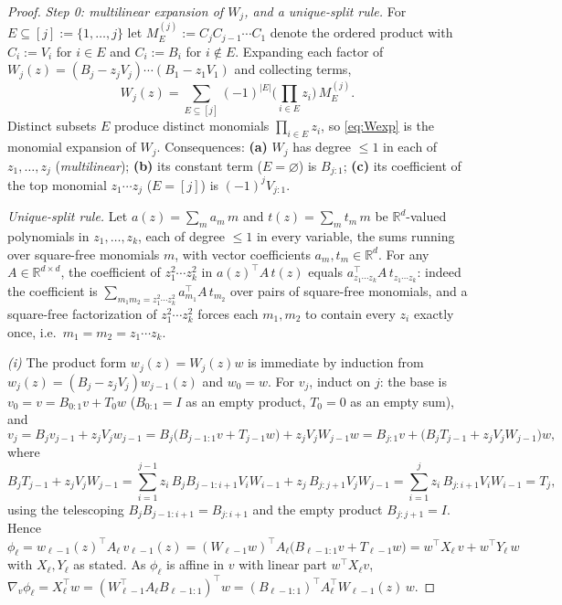 \documentclass[11pt]{article}
\theoremstyle{definition}
\theoremstyle{remark}
\theoremstyle{plain}
\newcommand{\R}{\mathbb{R}}
\begin{document}
\begin{proof}
\emph{Step 0: multilinear expansion of $W_j$, and a unique-split rule.}
For $E\subseteq[j]:=\{1,\dots,j\}$ let $M^{(j)}_E:=C_jC_{j-1}\cdots C_1$ denote the ordered
product with $C_i:=V_i$ for $i\in E$ and $C_i:=B_i$ for $i\notin E$.  Expanding each factor
of $W_j(z)=(B_j-z_jV_j)\cdots(B_1-z_1V_1)$ and collecting terms,
\begin{equation}\label{eq:Wexp}
W_j(z)=\sum_{E\subseteq[j]}(-1)^{|E|}\Big(\prod_{i\in E}z_i\Big)\,M^{(j)}_E .
\end{equation}
Distinct subsets $E$ produce distinct monomials $\prod_{i\in E}z_i$, so \eqref{eq:Wexp} is
the monomial expansion of $W_j$.  Consequences: \textbf{(a)} $W_j$ has degree $\le1$ in
each of $z_1,\dots,z_j$ (\emph{multilinear}); \textbf{(b)} its constant term
($E=\varnothing$) is $B_{j:1}$; \textbf{(c)} its coefficient of the top monomial
$z_1\cdots z_j$ ($E=[j]$) is $(-1)^{j}V_{j:1}$.

\emph{Unique-split rule.}  Let $a(z)=\sum_m a_m\,m$ and $t(z)=\sum_m t_m\,m$ be
$\R^d$-valued polynomials in $z_1,\dots,z_k$, each of degree $\le1$ in every variable, the
sums running over square-free monomials $m$, with vector coefficients $a_m,t_m\in\R^d$.
For any $A\in\R^{d\times d}$, the coefficient of $z_1^2\cdots z_k^2$ in $a(z)^\top A\,t(z)$
equals $a_{z_1\cdots z_k}^\top A\,t_{z_1\cdots z_k}$: indeed the coefficient is
$\sum_{m_1m_2=z_1^2\cdots z_k^2}a_{m_1}^\top A\,t_{m_2}$ over pairs of square-free
monomials, and a square-free factorization of $z_1^2\cdots z_k^2$ forces each $m_1,m_2$ to
contain every $z_i$ exactly once, i.e.\ $m_1=m_2=z_1\cdots z_k$.

\emph{(i)}  The product form $w_j(z)=W_j(z)w$ is immediate by induction from
$w_j(z)=(B_j-z_jV_j)w_{j-1}(z)$ and $w_0=w$.  For $v_j$, induct on $j$: the base is
$v_0=v=B_{0:1}v+T_0w$ ($B_{0:1}=I$ as an empty product, $T_0=0$ as an empty sum), and
\[
v_j=B_jv_{j-1}+z_jV_jw_{j-1}
=B_j\big(B_{j-1:1}v+T_{j-1}w\big)+z_jV_jW_{j-1}w
=B_{j:1}v+\big(B_jT_{j-1}+z_jV_jW_{j-1}\big)w,
\]
where
\[
B_jT_{j-1}+z_jV_jW_{j-1}
=\sum_{i=1}^{j-1}z_i\,B_jB_{j-1:i+1}V_iW_{i-1}+z_j\,B_{j:j+1}V_jW_{j-1}
=\sum_{i=1}^{j}z_i\,B_{j:i+1}V_iW_{i-1}
=T_j,
\]
using the telescoping $B_jB_{j-1:i+1}=B_{j:i+1}$ and the empty product
$B_{j:j+1}=I$.  Hence
\[
\phi_\ell=w_{\ell-1}(z)^\top A_\ell\,v_{\ell-1}(z)
=(W_{\ell-1}w)^\top A_\ell\big(B_{\ell-1:1}v+T_{\ell-1}w\big)
=w^\top X_\ell\,v+w^\top Y_\ell\,w
\]
with $X_\ell,Y_\ell$ as stated.  As $\phi_\ell$ is affine in $v$ with linear part
$w^\top X_\ell v$,
$\nabla_v\phi_\ell=X_\ell^\top w
=(W_{\ell-1}^\top A_\ell B_{\ell-1:1})^\top w
=(B_{\ell-1:1})^\top A_\ell^\top W_{\ell-1}(z)\,w$.


\end{proof}
\end{document}

